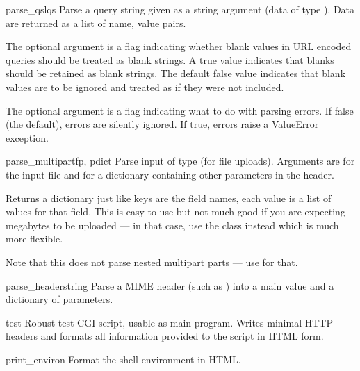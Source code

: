 \begin{funcdesc}{parse_qsl}{qs}
Parse a query string given as a string argument (data of type 
).  Data are
returned as a list of name, value pairs.

The optional argument  is
a flag indicating whether blank values in
URL encoded queries should be treated as blank strings.  
A true value indicates that blanks should be retained as 
blank strings.  The default false value indicates that
blank values are to be ignored and treated as if they were
not included.

The optional argument  is a flag indicating what
to do with parsing errors.  If false (the default), errors
are silently ignored.  If true, errors raise a ValueError
exception.
\end{funcdesc}

\begin{funcdesc}{parse_multipart}{fp, pdict}
Parse input of type  (for 
file uploads).  Arguments are  for the input file and
 for a dictionary containing other parameters in
the  header.

Returns a dictionary just like  keys are the
field names, each value is a list of values for that field.  This is
easy to use but not much good if you are expecting megabytes to be
uploaded --- in that case, use the  class instead
which is much more flexible.

Note that this does not parse nested multipart parts --- use
 for that.
\end{funcdesc}

\begin{funcdesc}{parse_header}{string}
Parse a MIME header (such as ) into a main
value and a dictionary of parameters.
\end{funcdesc}

\begin{funcdesc}{test}{}
Robust test CGI script, usable as main program.
Writes minimal HTTP headers and formats all information provided to
the script in HTML form.
\end{funcdesc}

\begin{funcdesc}{print_environ}{}
Format the shell environment in HTML.
\end{funcdesc}

